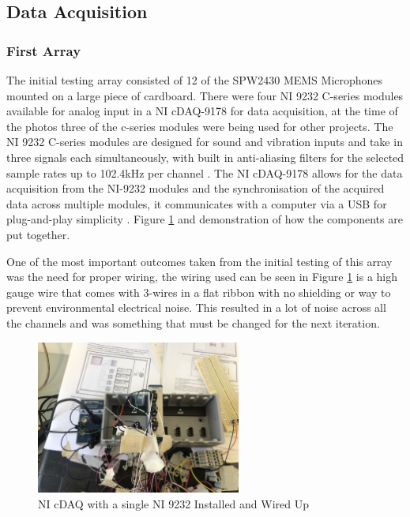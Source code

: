 \documentclass{UoNMCHA}
\numberwithin{equation}{section}
\begin{document}
\subsection{Data Acquisition} \label{sec:DAQ}

\subsubsection{First Array} \label{sec:First Design DAQ}
    The initial testing array consisted of 12 of the SPW2430 MEMS Microphones mounted on a large piece of cardboard. There were four NI 9232 C-series modules available for analog input in a NI cDAQ-9178 for data acquisition, at the time of the photos three of the c-series modules were being used for other projects. The NI 9232 C-series modules are designed for sound and vibration inputs and take in three signals each simultaneously, with built in anti-aliasing filters for the selected sample rates up to 102.4kHz per channel \citep{NI9232}. The NI cDAQ-9178 allows for the data acquisition from the NI-9232 modules and the synchronisation of the acquired data across multiple modules, it communicates with a computer via a USB for plug-and-play simplicity \citep{cDAQ9178}. Figure \ref{fig:TestSetup} and demonstration of how the components are put together.

    One of the most important outcomes taken from the initial testing of this array was the need for proper wiring, the wiring used can be seen in Figure \ref{fig:TestSetup} is a high gauge wire that comes with 3-wires in a flat ribbon with no shielding or way to prevent environmental electrical noise. This resulted in a lot of noise across all the channels and was something that must be changed for the next iteration.

    \begin{figure} [H]
        \centering
        \includegraphics[keepaspectratio, width = 0.6\textwidth]{Figures/cDAQ.jpg}
        \caption{NI cDAQ with a single NI 9232 Installed and Wired Up}
        \label{fig:TestSetup}
    \end{figure}
\end{document}
